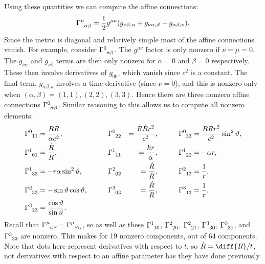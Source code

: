 \documentclass[fleqn]{NotesClass}
\newcommand*{\christoffel}[3]{\tensor{\Gamma}{^{#1}_{{#2}{#3}}}}
\begin{document}
    Using these quantities we can compute the affine connections:
    \begin{equation}
        \christoffel{\mu}{\alpha}{\beta} = \frac{1}{2}g^{\mu\nu}(g_{\nu\beta,\alpha} + g_{\nu\alpha,\beta} - g_{\alpha\beta,\nu}).
    \end{equation}
    Since the metric is diagonal and relatively simple most of the affine connections vanish.
    For example, consider \(\christoffel{0}{\alpha}{\beta}\).
    The \(g^{\mu\nu}\) factor is only nonzero if \(\nu = \mu = 0\).
    The \(g_{\nu\alpha}\) and \(g_{\nu\beta}\) terms are then only nonzero for \(\alpha = 0\) and \(\beta = 0\) respectively.
    These then involve derivatives of \(g_{00}\), which vanish since \(c^2\) is a constant.
    The final term, \(g_{\alpha\beta,\nu}\) involves a time derivative (since \(\nu = 0\)), and this is nonzero only when \((\alpha, \beta) = (1,1), (2,2), (3, 3)\).
    Hence there are three nonzero affine connections \(\christoffel{0}{\alpha}{\beta}\).
    Similar reasoning to this allows us to compute all nonzero elements:
    \begin{alignat}{8}
        \christoffel{0}{1}{1} &= \frac{R\dot{R}}{\alpha c^2}, \qquad && \christoffel{0}{2}{2} &= \frac{R\dot{R}r^2}{c^2}, \qquad && \christoffel{0}{3}{3} &= \frac{R\dot{R}r^2}{c^2}\sin^2\vartheta,\\
        \christoffel{1}{0}{1} &= \frac{\dot{R}}{R}, \qquad && \christoffel{1}{1}{1} &= \frac{kr}{\alpha}, \qquad && \christoffel{1}{2}{2} &= -\alpha r,\\
        \christoffel{1}{3}{3} &= - r\alpha \sin^2\vartheta, \qquad && \christoffel{2}{0}{2} &= \frac{\dot{R}}{R}, \qquad && \christoffel{2}{1}{2} &= \frac{1}{r},\\
        \christoffel{2}{3}{3} &= -\sin\vartheta\cos\vartheta, \qquad && \christoffel{3}{0}{3} &= \frac{\dot{R}}{R}, \qquad && \christoffel{3}{1}{3} &= \frac{1}{r},\\
        \christoffel{3}{2}{3} &= \frac{\cos\vartheta}{\sin\vartheta}.
    \end{alignat}
    Recall that \(\christoffel{\mu}{\alpha}{\beta} = \christoffel{\mu}{\beta}{\alpha}\), so as well as these \(\christoffel{1}{1}{0}\), \(\christoffel{2}{2}{0}\), \(\christoffel{2}{2}{1}\), \(\christoffel{3}{3}{0}\), \(\christoffel{3}{3}{1}\), and \(\christoffel{3}{3}{2}\) are nonzero.
    This makes for 19 nonzero components, out of 64 components.
    Note that dots here represent derivatives with respect to \(t\), so \(\dot{R} = \diff{R}/{t}\), not derivatives with respect to an affine parameter has they have done previously.
    
\end{document}
